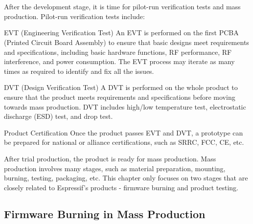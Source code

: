 \documentclass[a4paper,12pt]{book}
\begin{document}

\chapter[Firmware Burning and Testing for Mass Production]{}

\vspace{36pt}
After the development stage, it is time for pilot-run verification tests and mass production. Pilot-run verification tests include:

\begin{term}{EVT (Engineering Verification Test)}
An EVT is performed on the first PCBA (Printed Circuit Board Assembly) to ensure that basic designs meet requirements and specifications, including basic hardware functions, RF performance, RF interference, and power consumption. The EVT process may iterate as many times as required to identify and fix all the issues.
\end{term}

\begin{term}{DVT (Design Verification Test)}
A DVT is performed on the whole product to ensure that the product meets requirements and specifications before moving towards mass production. DVT includes high/low temperature test, electrostatic discharge (ESD) test, and drop test.
\end{term}

\begin{term}{Product Certification}
Once the product passes EVT and DVT, a prototype can be prepared for national or alliance certifications, such as SRRC, FCC, CE, etc.
\end{term}

After trial production, the product is ready for mass production. Mass production involves many stages, such as material preparation, mounting, burning, testing, packaging, etc. This chapter only focuses on two stages that are closely related to Espressif's products - firmware burning and product testing.

\section{Firmware Burning in Mass Production}
\end{document}
